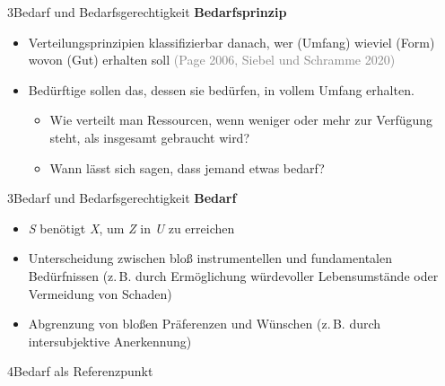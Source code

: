 \documentclass[xcolor=table,9pt,aspectratio=169]{beamer}
\begin{document}
\begin{frame}{\vspace*{10mm}3\hspace*{1em}Bedarf und Bedarfsgerechtigkeit}
\textbf{Bedarfsprinzip}\\
\medskip
\begin{itemize}
   \item Verteilungsprinzipien klassifizierbar danach, wer (Umfang) wieviel (Form) wovon (Gut) erhalten soll \textcolor{gray}{(Page 2006, Siebel und Schramme 2020)}
   \item Bedürftige sollen das, dessen sie bedürfen, in vollem Umfang erhalten.
   \begin{itemize}
      \item Wie verteilt man Ressourcen, wenn weniger oder mehr zur Verfügung steht, als insgesamt gebraucht wird?
      \item Wann lässt sich sagen, dass jemand etwas bedarf?
   \end{itemize}
\end{itemize}
\end{frame}


\begin{frame}{\vspace*{10mm}3\hspace*{1em}Bedarf und Bedarfsgerechtigkeit}
\textbf{Bedarf}\\
\medskip
\begin{itemize}
   \item \textit{S} benötigt \textit{X}, um \textit{Z} in \textit{U} zu erreichen
   \item Unterscheidung zwischen bloß instrumentellen und fundamentalen Bedürfnissen (z.\,B. durch Ermöglichung würdevoller Lebensumstände oder Vermeidung von Schaden)
   \item Abgrenzung von bloßen Präferenzen und Wünschen (z.\,B. durch intersubjektive Anerkennung)
\end{itemize}
\end{frame}


\begin{frame}
\begin{overlayarea}{\textwidth}{0.81\paperheight}{
   \vspace*{11mm}
   \textcolor{uolblue}
   {4\hspace*{1em}Bedarf als Referenzpunkt}
}
\end{overlayarea}
\end{frame}
\end{document}

